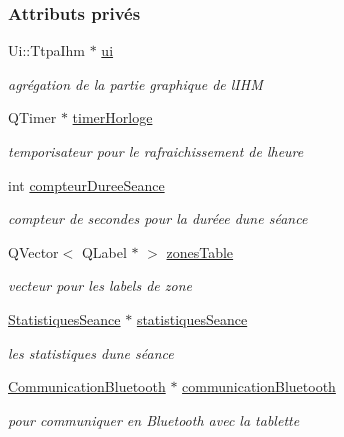 \subsubsection*{Attributs privés}
\begin{DoxyCompactItemize}
\item 
Ui\+::\+Ttpa\+Ihm $\ast$ \hyperlink{class_ttpa_ihm_ad5fae1222a667da158c26f3d0f0dce23}{ui}
\begin{DoxyCompactList}\small\item\em agrégation de la partie graphique de l\textquotesingle{}I\+HM \end{DoxyCompactList}\item 
Q\+Timer $\ast$ \hyperlink{class_ttpa_ihm_a447ad7262efa01d22bc3222e0e470087}{timer\+Horloge}
\begin{DoxyCompactList}\small\item\em temporisateur pour le rafraichissement de l\textquotesingle{}heure \end{DoxyCompactList}\item 
int \hyperlink{class_ttpa_ihm_abb5ab7cc023685e40cb278f0210f276f}{compteur\+Duree\+Seance}
\begin{DoxyCompactList}\small\item\em compteur de secondes pour la duréee d\textquotesingle{}une séance \end{DoxyCompactList}\item 
Q\+Vector$<$ Q\+Label $\ast$ $>$ \hyperlink{class_ttpa_ihm_af77d75f1aa3eb901b9410e5fc465ece8}{zones\+Table}
\begin{DoxyCompactList}\small\item\em vecteur pour les labels de zone \end{DoxyCompactList}\item 
\hyperlink{class_statistiques_seance}{Statistiques\+Seance} $\ast$ \hyperlink{class_ttpa_ihm_abed6897d6f7b4d3a5eb8dcc07651e740}{statistiques\+Seance}
\begin{DoxyCompactList}\small\item\em les statistiques d\textquotesingle{}une séance \end{DoxyCompactList}\item 
\hyperlink{class_communication_bluetooth}{Communication\+Bluetooth} $\ast$ \hyperlink{class_ttpa_ihm_a477c64fe999f4dec468fca9b04c5d842}{communication\+Bluetooth}
\begin{DoxyCompactList}\small\item\em pour communiquer en Bluetooth avec la tablette \end{DoxyCompactList}\item 

\end{DoxyCompactItemize}
